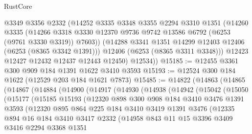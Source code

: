 \begin{lexlean}{RustCore}
\begin{coremodule}
          @3349
          @3356
          @2332
          (@14252
            @3335
            @3348
            @3355
            @2294
            @3310
            @1351
            (@14260
              @3335
              (@14266
                @3318
                @3330
                @12370
                @9736
                @9742
                @13586
                @6792
                (@6253 (@9761 @3330 @3319))
                @7603))
            (@14288 @3341 @1351 @14299 @12403 @12406 (@6253 (@8365 @3342 @1391)))
            @12406
            (@6253 (@8365 @3311 @3348)))
          @12423
          @12427
          @12432
          @12437
          @12443
          @12450)
        @12534))
@15185 := @12455 @3361 @300 @909 @184 @1391 @1622 @3410 @3593
@15193 := @12524 @300 @184 @1622 (@12529 @203 @184 @1621 @7873)
@15485 := @14822
    (@14863
      (@14865
        (@14867
          (@14884
            (@14900
              (@14917
                (@14930
                  (@14938
                    (@14942
                      (@15042
                        (@15050
                          (@15177
                            (@15185
                              @15193
                              (@12320
                                @898
                                @300
                                @908
                                @184
                                @3410
                                @3476
                                @1391
                                @3593
                                (@12320
                                  @895
                                  @864
                                  @225
                                  @184
                                  @3410
                                  @3419
                                  @1391
                                  @3476
                                  (@12335
                                    @894
                                    @16
                                    @184
                                    @3410
                                    @3417
                                    @2332
                                    (@14958
                                      @843
                                      @11
                                      @15
                                      @3396
                                      @3409
                                      @3416
                                      @2294
                                      @3368
                                      @1351

\end{coremodule}
\end{lexlean}
